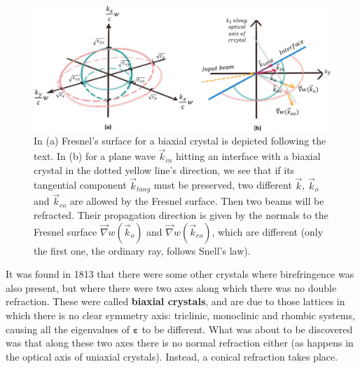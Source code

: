 \documentclass[11pt, a4paper, twoside]{article} %
\begin{document}
\begin{figure}[h!] 
     \centering 

    \includegraphics[width=0.82\linewidth]{uni.PNG}
    \caption{In (a) Fresnel's surface for a biaxial crystal is depicted following the text. In (b) for a plane wave $\vec{k}_{in}$ hitting an interface with a biaxial crystal in the dotted yellow line's direction, we see that if its tangential component $\vec{k}_{tang}$ must be preserved, two different $\vec{k}$, $\vec{k}_o$ and $\vec{k}_{eo}$ are allowed by the Fresnel surface. Then two beams will be refracted. Their propagation direction is given by the normals to the Fresnel surface $\vec{\nabla}w(\vec{k}_o)$ and $\vec{\nabla}w(\vec{k}_{eo})$, which are different (only the first one, the ordinary ray, follows Snell's law). }
        \label{fig:concentric1}
\vspace{-0.2cm}
\end{figure}

It was found in 1813 that there were some other crystals where birefringence was also present, but where there were two axes along which there was no double refraction. These were called {\bf biaxial crystals}, and are due to those lattices in which there is no clear symmetry axis: triclinic, monoclinic and rhombic systems, causing all the eigenvalues of $\pmb{\varepsilon}$ to be different. What was about to be discovered was that along these two axes there is no normal refraction either (as happens in the optical axis of uniaxial crystals). Instead, a conical refraction takes place.
\end{document}
